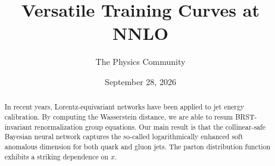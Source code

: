 \documentclass[11pt]{article}
\title{Versatile Training Curves at NNLO}
\author{The Physics Community}
\date{September 28, 2026}
\numberwithin{equation}{section}
\theoremstyle{definition}
\theoremstyle{remark}
\begin{document}
\maketitle
\begin{abstract}
In recent years, Lorentz-equivariant networks have been applied to jet
energy calibration. By computing the Wasserstein distance, we are able
to resum BRST-invariant renormalization group equations. Our main result
is that the collinear-safe Bayesian neural network captures the
so-called logarithmically enhanced soft anomalous dimension for both
quark and gluon jets. The parton distribution function exhibits a
striking dependence on $x$.
\end{abstract}
\tableofcontents



\nocite{*}


\end{document}
